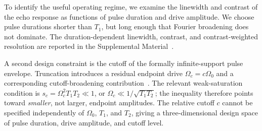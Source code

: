 


To identify the useful operating regime, we examine the linewidth and contrast
of the echo response as functions of pulse duration and drive amplitude.  We
choose pulse durations shorter than $T_1$, but long enough that Fourier
broadening does not dominate.  The duration-dependent linewidth, contrast,
and contrast-weighted resolution are reported in the Supplemental
Material~\cite{SupplementalMaterial}.

A second design constraint is the cutoff of the formally infinite-support
pulse envelope.  Truncation introduces a residual endpoint drive
$\Omega_c=c\Omega_0$ and a corresponding cutoff-broadening
contribution~\cite{boradjiev_qubit_2013,mihov_defying_2024,mihov_qubit_2024}.
The relevant weak-saturation condition is
$s_c=\Omega_c^2T_1T_2\ll1$, or
$\Omega_c\ll1/\sqrt{T_1T_2}$; the inequality therefore points toward
\emph{smaller}, not larger, endpoint amplitudes.  The relative cutoff $c$
cannot be specified independently of $\Omega_0$, $T_1$, and $T_2$, giving a
three-dimensional design space of pulse duration, drive amplitude, and cutoff
level.

